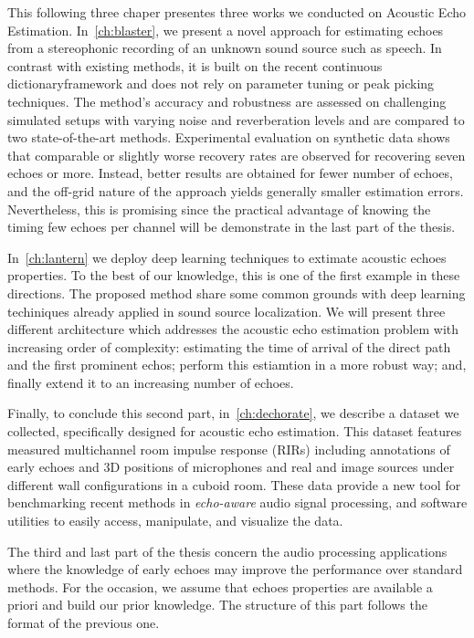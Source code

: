 This following three chaper presentes three works we conducted on Acoustic Echo Estimation.
In~\cref{ch:blaster}, we present a novel approach for estimating echoes from a stereophonic recording of an unknown sound source such as speech. In contrast with existing methods, it is built on the recent continuous dictionaryframework and does not rely on parameter tuning or peak picking techniques.
The method's accuracy and robustness are assessed on challenging simulated setups with varying noise and reverberation levels and are compared to two state-of-the-art methods. Experimental evaluation on synthetic data shows that comparable or slightly worse recovery rates are observed for recovering seven echoes or more. Instead, better results are obtained for fewer number of echoes, and the off-grid nature of the approach yields generally smaller estimation errors.
Nevertheless, this is promising since the practical advantage of knowing the timing few echoes per channel will be demonstrate in the last part of the thesis.

In~\cref{ch:lantern} we deploy deep learning techniques to extimate acoustic echoes properties. To the best of our knowledge, this is one of the first example in these directions. The proposed method share some common grounds with deep learning techiniques already applied in sound source localization. We will present three different architecture which addresses the acoustic echo estimation problem with increasing order of complexity: estimating the time of arrival of the direct path and the first prominent echos; perform this estiamtion in a more robust way; and, finally extend it to an increasing number of echoes.

Finally, to conclude this second part, in~\cref{ch:dechorate}, we describe a dataset we collected, specifically designed for  acoustic echo estimation. This dataset features measured multichannel room impulse response (RIRs) including annotations of early echoes and 3D positions of microphones and real and image sources under different wall configurations in a cuboid room. These data provide a new tool for benchmarking recent methods in \textit{echo-aware} audio signal processing, and software utilities to easily access, manipulate, and visualize the data.

The third and last part of the thesis concern the audio processing applications where the knowledge of early echoes may improve the performance over standard methods.
For the occasion, we assume that echoes properties are available a priori and build our prior knowledge.
The structure of this part follows the format of the previous one.

